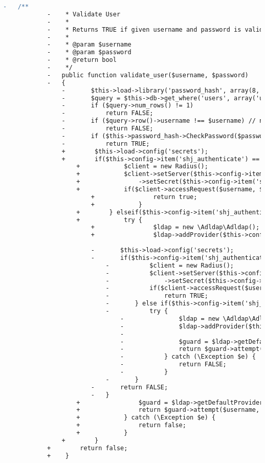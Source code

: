 \begin{lstlisting}[language=diff, caption=Perubahan pada kode User\_model.php]
			-	/**
			-	 * Validate User
			-	 *
			-	 * Returns TRUE if given username and password is valid for login
			-	 *
			-	 * @param $username
			-	 * @param $password
			-	 * @return bool
			-	 */
			-	public function validate_user($username, $password)
			-	{
				-		$this->load->library('password_hash', array(8, FALSE));
				-		$query = $this->db->get_where('users', array('username' => $username));
				-		if ($query->num_rows() != 1)
				-			return FALSE;
				-		if ($query->row()->username !== $username) // needed (because of utf8_general_ci [ci=case insensitive])
				-			return FALSE;
				-		if ($this->password_hash->CheckPassword($password, $query->row()->password))
				-			return TRUE;
				+        $this->load->config('secrets');
				+        if($this->config->item('shj_authenticate') == 'radius') {
					+            $client = new Radius();
					+            $client->setServer($this->config->item('shj_radius')['server']) // RADIUS server address
					+                ->setSecret($this->config->item('shj_radius')['secret']);
					+            if($client->accessRequest($username, $password)) {
						+                return true;
						+            }
					+        } elseif($this->config->item('shj_authenticate') == 'ldap') {
					+            try {
						+                $ldap = new \Adldap\Adldap();
						+                $ldap->addProvider($this->config->item('shj_ldap'));
						
						-		$this->load->config('secrets');
						-		if($this->config->item('shj_authenticate') == 'radius') {
							-			$client = new Radius();
							-			$client->setServer($this->config->item('shj_radius')['server']) // RADIUS server address
							-				->setSecret($this->config->item('shj_radius')['secret']);
							-			if($client->accessRequest($username, $password))
							-				return TRUE;
							-		} else if($this->config->item('shj_authenticate') == 'ldap') {
							-			try {
								-				$ldap = new \Adldap\Adldap();
								-				$ldap->addProvider($this->config->item('shj_ldap'));
								-				
								-				$guard = $ldap->getDefaultProvider()->getGuard();
								-				return $guard->attempt($username, $password);
								-			} catch (\Exception $e) {
								-				return FALSE;
								-			}
							-		}
						-		return FALSE;
						-	}
					+                $guard = $ldap->getDefaultProvider()->getGuard();
					+                return $guard->attempt($username, $password);
					+            } catch (\Exception $e) {
					+                return false;
					+            }
				+        }
			+        return false;
			+    }
		

\end{lstlisting}

